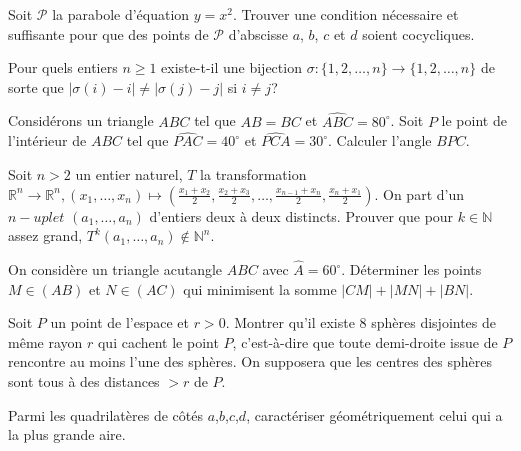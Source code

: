 \begin{exo}{ } Soit $\mathcal{P}$ la parabole d'équation $y=x^2$. Trouver une condition nécessaire et suffisante pour que des points de $\mathcal{P}$ d'abscisse $a$, $b$, $c$ et $d$ soient cocycliques.
\end{exo}

\begin{exo}{} Pour quels entiers $n \geq 1$ existe-t-il une bijection $\sigma : \{ 1,2, \ldots,n\} \rightarrow \{ 1,2, \ldots,n\}  $ de sorte que $\vert \sigma(i)-i \vert \neq \vert \sigma(j)-j \vert$ si $i \neq j$?
\end{exo}

\begin{exo}{}
Consid\'erons un triangle $ABC$ tel que $AB=BC$ et $\widehat{ABC} = 80^\circ$. Soit $P$ le point de l'int\'erieur de $ABC$ tel que $\widehat{PAC} = 40^\circ$ et $\widehat{PCA} = 30^\circ$. Calculer l'angle $\widehat{BPC}$.
\end{exo}

\begin{exo}{ }Soit $n>2$ un entier naturel, $T$ la transformation $\mathbb{R}^n\rightarrow \mathbb{R}^n,(x_1,\ldots,x_n)\mapsto (\frac{x_1+x_2}{2},\frac{x_2+x_3}{2},\ldots,\frac{x_{n-1}+x_{n}}{2},\frac{x_n+x_1}{2})$. On part d'un $n-uplet$ $(a_1,\ldots,a_n)$ d'entiers deux à deux distincts. Prouver que pour $k\in \mathbb{N}$ assez grand, $T^k(a_1,\ldots,a_n)\notin \mathbb{N}^n$.
\end{exo}

\begin{exo}{}
On considère un triangle acutangle $ABC$ avec $\widehat{A}=60^\circ$. Déterminer les points $M\in (AB)$ et $N\in (AC)$ qui minimisent la somme $|CM|+|MN|+|BN|$.
\end{exo}

\begin{exo}{}Soit $P$ un point de l'espace
et $r>0$. Montrer qu'il existe $8$ sphères disjointes de même rayon
$r$ qui cachent le point $P$, c'est-à-dire que toute demi-droite
issue de $P$ rencontre au moins l'une des sphères. On supposera que
les centres des sphères sont tous à des distances $>r$ de $P$.

\end{exo}

\begin{exo}{}Parmi les quadrilatères de côtés
$a$,$b$,$c$,$d$, caractériser géométriquement celui qui a la plus
grande aire.
\end{exo}

